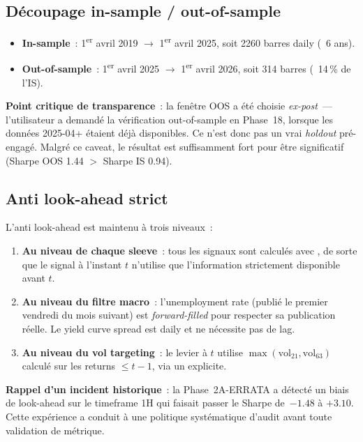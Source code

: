 \subsection{Découpage in-sample / out-of-sample}

\begin{itemize}
\item \textbf{In-sample}~: 1\textsuperscript{er} avril 2019 $\rightarrow$ 1\textsuperscript{er} avril 2025, soit 2260 barres daily (~6 ans).
\item \textbf{Out-of-sample}~: 1\textsuperscript{er} avril 2025 $\rightarrow$ 1\textsuperscript{er} avril 2026, soit 314 barres (~14\,\% de l'IS).
\end{itemize}

\begin{warningbox}
\textbf{Point critique de transparence}~: la fenêtre OOS a été choisie \emph{ex-post}~--- l'utilisateur a demandé la vérification out-of-sample en Phase~18, lorsque les données 2025-04+ étaient déjà disponibles. Ce n'est donc pas un vrai \emph{holdout} pré-engagé. Malgré ce caveat, le résultat est suffisamment fort pour être significatif (Sharpe OOS 1.44 $>$ Sharpe IS 0.94).
\end{warningbox}

\subsection{Anti look-ahead strict}

L'anti look-ahead est maintenu à trois niveaux~:

\begin{enumerate}
\item \textbf{Au niveau de chaque sleeve}~: tous les signaux sont calculés avec , de sorte que le signal à l'instant $t$ n'utilise que l'information strictement disponible avant $t$.
\item \textbf{Au niveau du filtre macro}~: l'unemployment rate (publié le premier vendredi du mois suivant) est \emph{forward-filled} pour respecter sa publication réelle. Le yield curve spread est daily et ne nécessite pas de lag.
\item \textbf{Au niveau du vol targeting}~: le levier à $t$ utilise $\max(\mathrm{vol}_{21}, \mathrm{vol}_{63})$ calculé sur les returns $\le t-1$, via un  explicite.
\end{enumerate}

\begin{insightbox}
\textbf{Rappel d'un incident historique}~: la Phase~2A-ERRATA a détecté un biais de look-ahead sur le timeframe 1H qui faisait passer le Sharpe de~$-1.48$ à $+3.10$. Cette expérience a conduit à une politique systématique d'audit  avant toute validation de métrique.
\end{insightbox}

